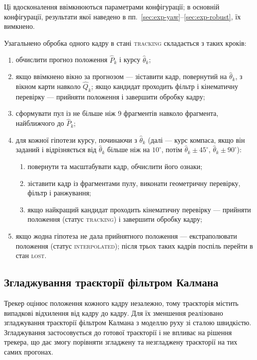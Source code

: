 \documentclass[a4paper, 12pt, titlepage]{article}
\begin{document}
Ці вдосконалення ввімкнюються параметрами конфігурації; в основній конфігурації, результати якої наведено в пп.~\ref{sec:exp-yaw}--\ref{sec:exp-robust}, їх вимкнено.

Узагальнено обробка одного кадру в стані \textsc{tracking} складається з таких кроків:
\begin{enumerate}
    \item обчислити прогноз положення $\hat{P}_k$ і курсу $\hat{\theta}_k$;
    \item якщо ввімкнено вікно за прогнозом --- зіставити кадр, повернутий на $\hat{\theta}_k$, з вікном карти навколо $\hat{Q}_k$; якщо кандидат проходить фільтр і кінематичну перевірку --- прийняти положення і завершити обробку кадру;
    \item сформувати пул із не більше ніж 9 фрагментів навколо фрагмента, найближчого до $\hat{P}_k$;
    \item для кожної гіпотези курсу, починаючи з $\hat{\theta}_k$ (далі --- курс компаса, якщо він заданий і відрізняється від $\hat{\theta}_k$ більше ніж на $10^\circ$, потім $\hat{\theta}_k \pm 45^\circ$, $\hat{\theta}_k \pm 90^\circ$):
    \begin{enumerate}
        \item повернути та масштабувати кадр, обчислити його ознаки;
        \item зіставити кадр із фрагментами пулу, виконати геометричну перевірку, фільтр і ранжування;
        \item якщо найкращий кандидат проходить кінематичну перевірку --- прийняти положення (статус \textsc{tracking}) і завершити обробку кадру;
    \end{enumerate}
    \item якщо жодна гіпотеза не дала прийнятного положення --- екстраполювати положення (статус \textsc{interpolated}); після трьох таких кадрів поспіль перейти в стан \textsc{lost}.
\end{enumerate}

\subsection{Згладжування траєкторії фільтром Калмана}
\label{sec:kalman}

Трекер оцінює положення кожного кадру незалежно, тому траєкторія містить випадкові відхилення від кадру до кадру. Для їх зменшення реалізовано згладжування траєкторії фільтром Калмана \cite{kalman} з моделлю руху зі сталою швидкістю. Згладжування застосовується до готової траєкторії і не впливає на рішення трекера, що дає змогу порівняти згладжену та незгладжену траєкторії на тих самих прогонах.
\end{document}
